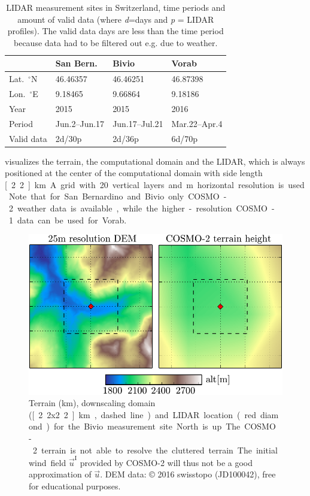 \documentclass[twocolumn,letterpaper]{IEEEAerospaceCLS}
\begin{document}
\begin{table}[htb]
\centering
\caption{LIDAR measurement sites in Switzerland, time periods and amount of valid data (where \emph{d}=days and \emph{p} = LIDAR profiles). The valid data days are less than the time period because data had to be filtered out e.g. due to weather.}

\begin{tabular}{l l l l}
\toprule 
 & San Bern. & Bivio & Vorab\\[0.8ex]
\midrule
Lat.~$^\circ$N & 46.46357 & 46.46251 & 46.87398 \\
Lon.~$^\circ$E & 9.18465 & 9.66864 & 9.18186 \\
Year & 2015 & 2015 & 2016 \\
Period &  Jun.2--Jun.17 & Jun.17--Jul.21 & Mar.22--Apr.4 \\ 
Valid data & 2d/30p & 2d/36p & 6d/70p\\ 
\bottomrule
\end{tabular}

\label{tab:PL_WindPred_campaign_details}
\end{table}

 visualizes the terrain, the computational domain and the LIDAR, which is always positioned at the center of the computational domain with side length \unit[2.2]{km}. A grid with 20 vertical layers and \unit[50]{m} horizontal resolution is used. Note that for San Bernardino and Bivio only COSMO-2 weather data is available, while the higher-resolution COSMO-1 data can be used for Vorab.

\begin{figure}[htbp]
\centering
\includegraphics[width=\columnwidth]{images/WindPred/Results/terrain_bivio2.pdf}
\caption[Terrain measurement locations]{Terrain (\unit[5x5]{km}), downscaling domain (\unit[2.2x2.2]{km}, dashed line) and LIDAR location (red diamond) for the Bivio measurement site. North is up. The COSMO-2 terrain is not able to resolve the cluttered terrain. The initial wind field $\vec{u}^\text{I}$ provided by COSMO-2 will thus not be a good approximation of $\vec{u}$. DEM data: \copyright{} 2016 swisstopo (JD100042), free for educational purposes.}
\label{fig:PL_WindPred_terrains}
\end{figure}
\end{document}
